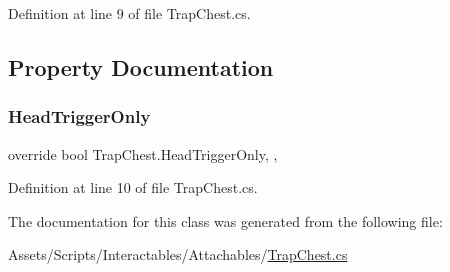 Definition at line 9 of file Trap\+Chest.\+cs.



\subsection{Property Documentation}
\mbox{\label{class_trap_chest_abb4524fa9580faa05a738aff2ad4659e}} 
\subsubsection{\texorpdfstring{Head\+Trigger\+Only}{HeadTriggerOnly}}
{\footnotesize\ttfamily override bool Trap\+Chest.\+Head\+Trigger\+Only\hspace{0.3cm}{\ttfamily [get]}, {\ttfamily [set]}, {\ttfamily [protected]}}



Definition at line 10 of file Trap\+Chest.\+cs.



The documentation for this class was generated from the following file\+:\begin{DoxyCompactItemize}
\item 
Assets/\+Scripts/\+Interactables/\+Attachables/\mbox{\hyperlink{_trap_chest_8cs}{Trap\+Chest.\+cs}}\end{DoxyCompactItemize}
